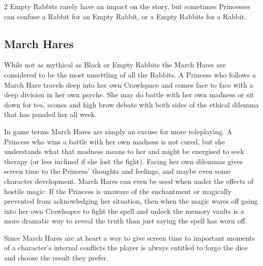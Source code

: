 \begin{multicols}{2}
Empty Rabbits rarely have an impact on the story, but sometimes Princesses can confuse a Rabbit for an Empty Rabbit, or a Empty Rabbits for a Rabbit.

\subsection*{March Hares}

While not as mythical as Black or Empty Rabbits the March Hares are considered to be the most unsettling of all the Rabbits. A Princess who follows a March Hare travels deep into her own Crawlspace and comes face to face with a deep division in her own psyche. She may do battle with her own madness or sit down for tea, scones and high brow debate with both sides of the ethical dilemma that has puzzled her all week. 

In game terms March Hares are simply an excuse for more roleplaying. A Princess who wins a battle with her own madness is not cured, but she understands what that madness means to her and might be energised to seek therapy (or less inclined if she lost the fight). Facing her own dilemmas gives screen time to the Princess' thoughts and feelings, and maybe even some character development. March Hares can even be used when under the effects of hostile magic: If the Princess is unaware of the enchantment or magically prevented from acknowledging her situation, then when the magic wares off going into her own Crawlsapce to fight the spell and unlock the memory vaults is a more dramatic way to reveal the truth than just saying the spell has worn off. 

Since March Hares are at heart a way to give screen time to important moments of a character’s internal conflicts the player is always entitled to forgo the dice and choose the result they prefer.


\end{multicols}
